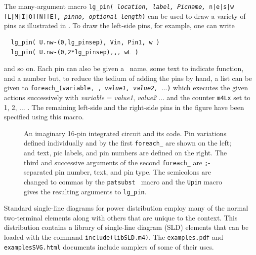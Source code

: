 The many-argument macro
 {\tt lg\_pin( {\sl location, label, Picname,} n|e|s|w [L|M|I|O][N][E],
  {\sl pinno, optional length})}
can be used to draw a variety of pins as illustrated in .
To draw the left-side pins, for example, one can write
\begin{verbatim}
  lg_pin( U.nw-(0,lg_pinsep), Vin, Pin1, w )
  lg_pin( U.nw-(0,2*lg_pinsep),,, wL )
\end{verbatim}
\noindent
and so on.
Each pin can also be given a \pic\ name, some text
to indicate function, and a number but,
to reduce the tedium of adding the pins by hand, a list
can be given to
{\tt foreach\_(variable,
,
{\sl value1, value2, $\ldots$})}
which executes the given actions successively with
 {\sl variable} = {\sl value1}, {\sl value2} $\ldots$ and the
 counter {\tt m4Lx} set to 1, 2, $\ldots$ .  The remaining left-side
 and the right-side pins in the figure have been specified using this
 macro.
\begin{figure}[H]
   \parbox{\textwidth}{\small}%
   \hfill\llap{\raise-0.15in\hbox{ }}%
   \vspace*{-\baselineskip}%
   \caption{ An imaginary 16-pin integrated circuit and its code.
    Pin variations defined individually and by the first {\tt foreach\_}
    are shown on the left; and text, pic labels, and pin
    numbers are defined on the right.
    The third and successive arguments of the second
    {\tt foreach\_}
    are {\tt ;}-separated pin number, text, and pin type. The
    semicolons are changed to commas by the {\tt patsubst} \Mfour\ macro
    and the {\tt Upin} macro gives the resulting arguments to {\tt lg\_pin}.
\label{sampleIC}}%
   \end{figure}


 Standard single-line diagrams for power distribution employ many of
 the normal two-terminal elements along with others that are unique to
 the context.  This distribution contains a library of single-line
 diagram (SLD) elements that can be loaded with the
 command {\tt include(libSLD.m4)}.
 The {\tt examples.pdf} and {\tt examplesSVG.html}
 documents include samplers of some of their uses.

